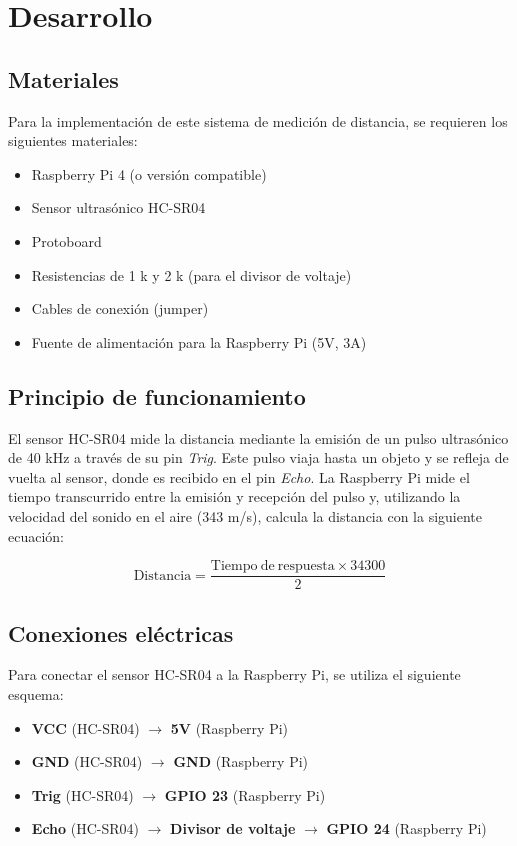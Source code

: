 \section{Desarrollo}
\subsection{Materiales}
Para la implementación de este sistema de medición de distancia, se requieren los siguientes materiales:

\begin{itemize}
	\item Raspberry Pi 4 (o versión compatible)
	\item Sensor ultrasónico HC-SR04
	\item Protoboard
	\item Resistencias de 1 k\textohm{} y 2 k\textohm{} (para el divisor de voltaje)
	\item Cables de conexión (jumper)
	\item Fuente de alimentación para la Raspberry Pi (5V, 3A)
\end{itemize}

\subsection{Principio de funcionamiento}
El sensor HC-SR04 mide la distancia mediante la emisión de un pulso ultrasónico de 40 kHz a través de su pin \textit{Trig}. Este pulso viaja hasta un objeto y se refleja de vuelta al sensor, donde es recibido en el pin \textit{Echo}. La Raspberry Pi mide el tiempo transcurrido entre la emisión y recepción del pulso y, utilizando la velocidad del sonido en el aire (343 m/s), calcula la distancia con la siguiente ecuación:

\begin{equation}
	\mathrm{Distancia} = \frac{\mathrm{Tiempo\ de\ respuesta} \times 34300}{2}
\end{equation}

\subsection{Conexiones eléctricas}
Para conectar el sensor HC-SR04 a la Raspberry Pi, se utiliza el siguiente esquema:

\begin{itemize}
	\item \textbf{VCC} (HC-SR04) $\rightarrow$ \textbf{5V} (Raspberry Pi)
	\item \textbf{GND} (HC-SR04) $\rightarrow$ \textbf{GND} (Raspberry Pi)
	\item \textbf{Trig} (HC-SR04) $\rightarrow$ \textbf{GPIO 23} (Raspberry Pi)
	\item \textbf{Echo} (HC-SR04) $\rightarrow$ \textbf{Divisor de voltaje} $\rightarrow$ \textbf{GPIO 24} (Raspberry Pi)
\end{itemize}

